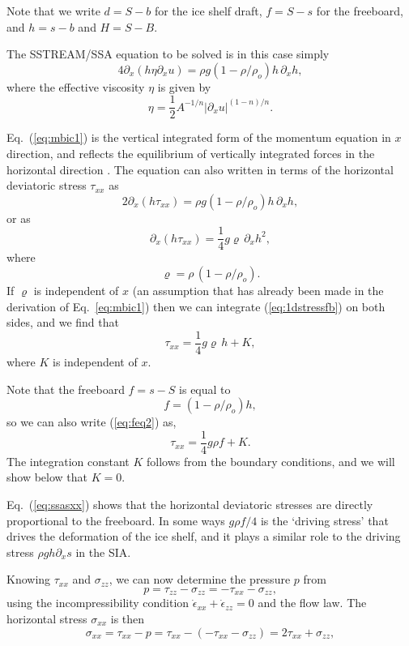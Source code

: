 \documentclass[10pt,a4paper]{book}
\newcommand{\p}{\partial}
\newcommand{\exx}{\dot{\epsilon}_{xx}}
\newcommand{\ezz}{\dot{\epsilon}_{zz}}
\newcommand{\txx}{\tau_{xx}}
\newcommand{\tzz}{\tau_{zz}}
\newcommand{\sxx}{\sigma_{xx}}
\newcommand{\szz}{\sigma_{zz}}
\begin{document}
Note that we write $d=S-b$ for the ice shelf draft, $f=S-s$ for the
freeboard, and $h=s-b$ and $H=S-B$.


The SSTREAM/SSA equation to be solved is
in this case simply
\begin{equation} 
4 \p_x ( h \eta \p_x u ) =\rho g (1-\rho/\rho_o) h \, \p_x h  ,
\label{eq:mbic1}
\end{equation}
where the  effective viscosity $\eta$ is given by
\[ 
\eta=\frac{1}{2} A^{-1/n} |\partial_x u|^{(1-n)/n}.
\]

Eq.~(\ref{eq:mbic1}) is the vertical integrated form of the momentum
equation in $x$ direction, and reflects the equilibrium of vertically
integrated forces in the horizontal direction .  The equation can also written
in terms of the horizontal deviatoric stress $\tau_{xx}$ as
\begin{equation} 
2 \p_x ( h \tau_{xx} ) =\rho g (1-\rho/\rho_o) h \, \p_x h  ,
\label{eq:1dstressf}
\end{equation}
or as
\begin{equation} 
\p_x ( h \tau_{xx} ) =\frac{1}{4} g \varrho \, \p_x h^2  ,
\label{eq:1dstressfb}
\end{equation}
where
\[
\varrho=\rho \, (1-\rho/\rho_o) .
\] 
If $\varrho$ is independent of $x$
(an assumption that has already been made in the derivation of
Eq.~\ref{eq:mbic1}) then we can integrate (\ref{eq:1dstressfb}) on both
sides, and we find that
\begin{equation}
\tau_{xx} =\frac{1}{4} g \varrho \,  h  + K,
\label{eq:feq2}
\end{equation}
where $K$ is independent of $x$.

Note that the freeboard $f=s-S$ is equal to 
\[
f=(1-\rho/\rho_o) h,
\]
so we can also write (\ref{eq:feq2}) as,
\begin{equation}
\txx =\frac{1}{4} g \rho f  + K.
\label{eq:ssasxx}
\end{equation}
The integration constant $K$ follows from the boundary
conditions, and we will show below that $K=0$. 

Eq.~(\ref{eq:ssasxx}) shows that the horizontal deviatoric stresses
are directly proportional to the freeboard. In some ways $g \rho f/4$ is
the `driving stress' that drives the deformation of the ice shelf, and
it plays a similar role to the driving stress $\rho g h \p_x s$ in the
SIA.


Knowing $\txx$ and $\szz$, we can now determine the pressure $p$
from
\begin{equation}
p=\tzz-\szz=-\txx-\szz,
\label{eq:p2}
\end{equation}
using the incompressibility condition $\exx+\ezz=0$ and the flow law.
The horizontal stress $\sxx$ is then
\begin{equation}
\sxx=\txx-p=\txx-(-\txx-\szz)=2 \txx+\szz ,
\label{eq:sxx2}
\end{equation}
\end{document}
